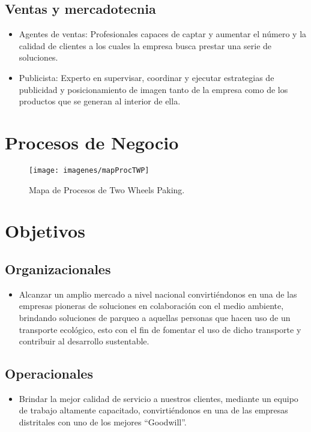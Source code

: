\subsection{Ventas y mercadotecnia}
\begin{itemize}
	\item Agentes de ventas: Profesionales capaces de captar y aumentar el número y la calidad de clientes a los cuales la empresa busca prestar una serie de soluciones.
	\item Publicista: Experto en supervisar, coordinar y ejecutar estrategias de publicidad y posicionamiento de imagen tanto de la empresa como de los productos que se generan al interior de ella.
\end{itemize}


\section{Procesos de Negocio}
\begin{figure}[H]
	\centering
	\texttt{[image: imagenes/mapProcTWP]}
	\caption{Mapa de Procesos de Two Wheels Paking.}
	\label{fig:awesome_image}
\end{figure}

\section{Objetivos}
\subsection{Organizacionales}
\begin{itemize}
	\item Alcanzar un amplio mercado a nivel nacional convirtiéndonos en una de las empresas pioneras de soluciones en colaboración con el medio ambiente, brindando soluciones de parqueo a aquellas personas que hacen uso de un transporte ecológico, esto con el fin de fomentar el uso de dicho transporte y contribuir al desarrollo sustentable.
\end{itemize}

\subsection{Operacionales}
\begin{itemize}
	\item Brindar la mejor calidad de servicio a nuestros clientes, mediante un equipo de trabajo altamente capacitado, convirtiéndonos en una de las empresas distritales con uno de los mejores “Goodwill”.
\end{itemize}

